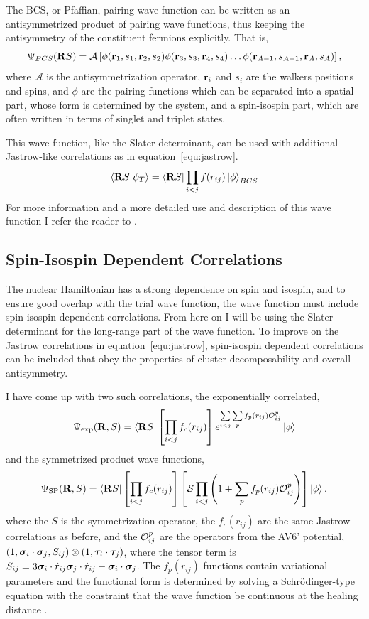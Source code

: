 The BCS, or Pfaffian, pairing wave function can be written as an antisymmetrized product of pairing wave functions, thus keeping the antisymmetry of the constituent fermions explicitly. That is,
\begin{equation}
   \Psi_{BCS}(\mathbf{R} S) = \mathcal{A}\left[\phi(\mathbf{r}_1,s_1,\mathbf{r}_2,s_2)\phi(\mathbf{r}_3,s_3,\mathbf{r}_4,s_4)\ldots\phi(\mathbf{r}_{A-1},s_{A-1},\mathbf{r}_A,s_A)\right],
\end{equation}
where $\mathcal{A}$ is the antisymmetrization operator, $\mathbf{r}_i$ and $s_i$ are the walkers positions and spins, and $\phi$ are the pairing functions which can be separated into a spatial part, whose form is determined by the system, and a spin-isospin part, which are often written in terms of singlet and triplet states.

This wave function, like the Slater determinant, can be used with additional Jastrow-like correlations as in equation~\ref{equ:jastrow}.
\begin{equation}
   \left< \mathbf{R} S | \psi_T \right> = \left< \mathbf{R} S \right|\prod\limits_{i<j}f(r_{ij}) \left| \phi \right>_{BCS}
\end{equation}
For more information and a more detailed use and description of this wave function I refer the reader to \cite{madeira2018_diss}.

\subsection{Spin-Isospin Dependent Correlations}
The nuclear Hamiltonian has a strong dependence on spin and isospin, and to ensure good overlap with the trial wave function, the wave function must include spin-isospin dependent correlations. From here on I will be using the Slater determinant for the long-range part of the wave function. To improve on the Jastrow correlations in equation~\ref{equ:jastrow}, spin-isospin dependent correlations can be included that obey the properties of cluster decomposability and overall antisymmetry.

I have come up with two such correlations, the exponentially correlated,
\begin{equation}
   \Psi_{\text{exp}}(\mathbf{R}, S) = \left< \mathbf{R} S \right|\left[\prod\limits_{i<j}f_c(r_{ij})\right] e^{\sum\limits_{i<j}\sum\limits_{p}f_p(r_{ij})\mathcal{O}_{ij}^p}\left| \phi \right>
   \label{equ:exppsi}
\end{equation}
and the symmetrized product wave functions,
\begin{equation}
   \Psi_{\text{SP}}(\mathbf{R}, S) = \left< \mathbf{R} S \right|\left[\prod\limits_{i<j}f_c(r_{ij})\right] \left[\mathcal{S}\prod\limits_{i<j}\left(1+\sum\limits_pf_p(r_{ij})\mathcal{O}_{ij}^p\right)\right] \left| \phi \right>.
   \label{equ:prodpsi}
\end{equation}
where the $S$ is the symmetrization operator, the $f_c(r_{ij})$ are the same Jastrow correlations as before, and the $\mathcal{O}_{ij}^p$ are the operators from the AV6' potential, $(1,\bm{\sigma}_i\cdot\bm{\sigma}_j,S_{ij})\otimes(1,\bm{\tau}_i\cdot\bm{\tau}_j)$, where the tensor term is $S_{ij} = 3\bm{\sigma}_i\cdot\hat{r}_{ij}\bm{\sigma}_j\cdot\hat{r}_{ij}-\bm{\sigma}_i\cdot\bm{\sigma}_j$. The $f_p(r_{ij})$ functions contain variational parameters and the functional form is determined by solving a Schr\"odinger-type equation with the constraint that the wave function be continuous at the healing distance \cite{pandharipande1979,pandharipande1977}.

